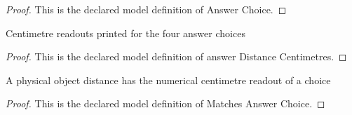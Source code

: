 \begin{proof}
  This is the declared model definition of Answer Choice.
\end{proof}
\begin{definition}
  \label{def:physics:phyx-mini-0113:phyxminiproblems-problemphyxmini0113-answerdistancecentimetres}
  Centimetre readouts printed for the four answer choices
\end{definition}
\begin{proof}
  This is the declared model definition of answer Distance Centimetres.
\end{proof}
\begin{definition}
  \label{def:physics:phyx-mini-0113:phyxminiproblems-problemphyxmini0113-matchesanswerchoice}
  A physical object distance has the numerical centimetre readout of a choice
\end{definition}
\begin{proof}
  This is the declared model definition of Matches Answer Choice.
\end{proof}
